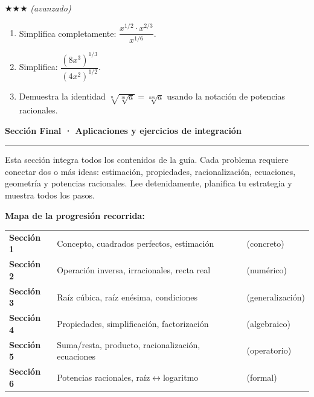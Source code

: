 \documentclass[11pt, letterpaper]{article}
\newcommand{\seccionheader}[2]{%
  \vspace{1.2em}
  \noindent
  {\Large\bfseries\color{#1} #2}\par
  \vspace{0.3em}
  {\noindent\color{#1}\rule{\linewidth}{0.8pt}}
  \vspace{0.8em}
}
\begin{document}
$\bigstar\bigstar\bigstar$ \textit{(avanzado)}

\begin{enumerate}[label=\textbf{\arabic*.}, leftmargin=*, resume]
  \item Simplifica completamente: $\dfrac{x^{1/2}\cdot x^{2/3}}{x^{1/6}}$.

  \item Simplifica: $\dfrac{(8x^3)^{1/3}}{(4x^2)^{1/2}}$.

  \item Demuestra la identidad $\sqrt[n]{\sqrt[m]{a}}=\sqrt[nm]{a}$ usando la notación de potencias racionales.
\end{enumerate}

\clearpage
\seccionheader{blockc}{Sección Final · Aplicaciones y ejercicios de integración}

\begin{tcolorbox}[importantbox, title={Indicaciones}]
Esta sección integra todos los contenidos de la guía. Cada problema requiere conectar dos o más ideas: estimación, propiedades, racionalización, ecuaciones, geometría y potencias racionales. Lee detenidamente, planifica tu estrategia y muestra todos los pasos.

\medskip
\textbf{Mapa de la progresión recorrida:}

\begin{center}
\renewcommand{\arraystretch}{1.25}
\begin{tabular}{lll}
\textbf{Sección 1} & Concepto, cuadrados perfectos, estimación & (concreto)\\
\textbf{Sección 2} & Operación inversa, irracionales, recta real & (numérico)\\
\textbf{Sección 3} & Raíz cúbica, raíz enésima, condiciones & (generalización)\\
\textbf{Sección 4} & Propiedades, simplificación, factorización & (algebraico)\\
\textbf{Sección 5} & Suma/resta, producto, racionalización, ecuaciones & (operatorio)\\
\textbf{Sección 6} & Potencias racionales, raíz$\leftrightarrow$logaritmo & (formal)\\
\end{tabular}
\end{center}
\end{tcolorbox}
\end{document}
